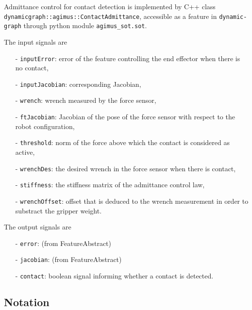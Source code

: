 \documentclass{article}
\begin{document}
Admittance control for contact detection is implemented by C++ class \\ \texttt{dynamicgraph::agimus::ContactAdmittance}, accessible as a feature in \texttt{dynamic-graph} through python module \texttt{agimus\_sot.sot}.

The input signals are
\begin{itemize}
\item[-]\texttt{inputError}: error of the feature controlling the end
  effector when there is no contact,
\item[-] \texttt{inputJacobian}: corresponding Jacobian,
\item[-] \texttt{wrench}: wrench measured by the force sensor,
\item[-] \texttt{ftJacobian}: Jacobian of the pose of the force sensor with respect to the robot configuration,
\item[-] \texttt{threshold}: norm of the force above which the contact is
    considered as active,
\item[-] \texttt{wrenchDes}: the desired wrench in the force sensor when
  there is contact,
\item[-] \texttt{stiffness}: the stiffness matrix of the admittance control law,
\item[-] \texttt{wrenchOffset}: offset that is deduced to the wrench measurement
  in order to substract the gripper weight.
\end{itemize}

The output signals are
\begin{itemize}
\item[-] \texttt{error}: (from FeatureAbstract)
\item[-] \texttt{jacobian}: (from FeatureAbstract)
\item[-] \texttt{contact}: boolean signal informing whether a contact is detected.
\end{itemize}

\subsection{Notation}
\end{document}
